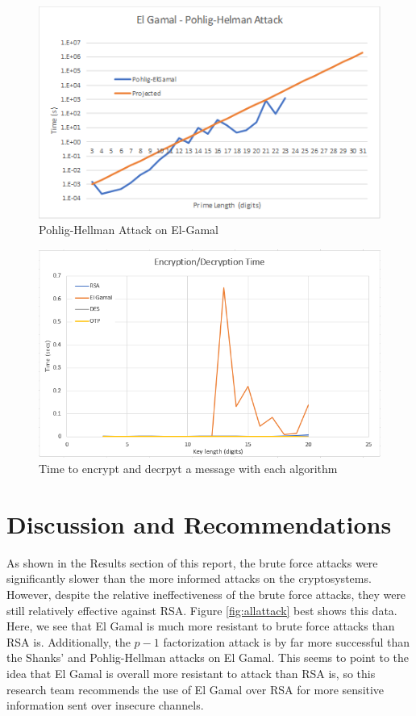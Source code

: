 \documentclass[12pt]{report}
\begin{document}
\begin{figure}[hp!] %
    \begin{center}
        \includegraphics[width=0.85\linewidth]{ElGamalPohlig.PNG}
        \caption{Pohlig-Hellman Attack on El-Gamal}
        \label{fig:el-gamal3}
    \end{center}
\end{figure}

\begin{figure}[hp!] %
    \begin{center}
        \includegraphics[width=0.85\linewidth]{TransferBenchmarks.png}
        \caption{Time to encrypt and decrpyt a message with each algorithm}
        \label{fig:TransferBenchmarks}
    \end{center}
\end{figure}
\FloatBarrier
\section{Discussion and Recommendations}
As shown in the Results section of this report, the brute force attacks were significantly slower than the more informed attacks on the cryptosystems. However,
despite the relative ineffectiveness of the brute force attacks, they were still relatively effective against RSA. Figure \ref{fig:allattack} best shows this data.
Here, we see that El Gamal is much more resistant to brute force attacks than RSA is. Additionally, the $p-1$ factorization attack is by far more successful than
the Shanks' and Pohlig-Hellman attacks on El Gamal. This seems to point to the idea that El Gamal is overall more resistant to attack than RSA is, so this research
team recommends the use of El Gamal over RSA for more sensitive information sent over insecure channels.
\end{document}
